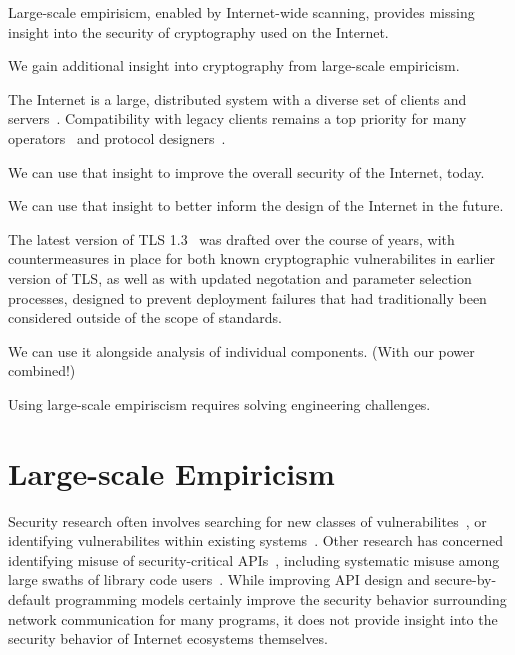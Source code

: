 
Large-scale empirisicm, enabled by Internet-wide scanning, provides missing
insight into the security of cryptography used on the Internet. 


We gain additional insight into cryptography from large-scale empiricism.

The Internet is a large, distributed system with a diverse set of clients and
servers~\cite{something}. Compatibility with legacy clients remains a top priority 
for many operators~\cite{something} and protocol designers~\cite{something}.

%

We can use that insight to improve the overall security of the Internet, today.

We can use that insight to better inform the design of the Internet in the future.

The latest version of TLS 1.3~\cite{rfc8446} was drafted over the course of \TK years, with countermeasures
in place for both known cryptographic vulnerabilites in earlier version of TLS, as well as with updated negotation and parameter selection processes, designed to prevent deployment failures that had traditionally been considered outside of the scope of standards.

We can use it alongside analysis of individual components. (With our power combined!)

Using large-scale empiriscism requires solving engineering challenges.

\section{Large-scale Empiricism}

% 
% 
% 
% 
% 
% 
% 

Security research often involves searching for new classes of
vulnerabilites~\cite{something}, or identifying vulnerabilites within
existing systems~\cite{something}. Other research has concerned identifying
misuse of security-critical APIs~\cite{gutmann-lessons}, including systematic
misuse among large swaths of library code
users~\cite{most-dangerous-code-2012}. While improving API design and
secure-by-default programming models certainly improve the security behavior
surrounding network communication for many programs, it does not provide
insight into the security behavior of Internet ecosystems themselves.

